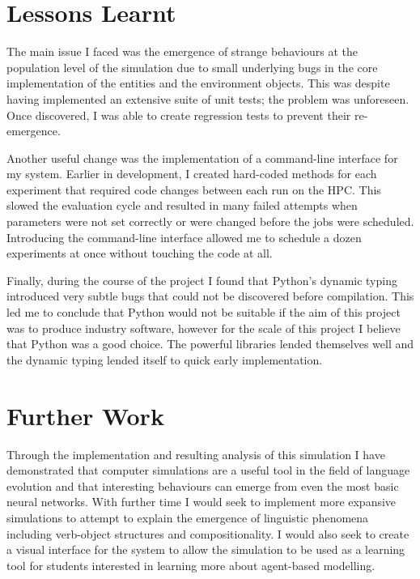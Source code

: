 \documentclass[12pt,a4paper]{report}
\begin{document}
\section{Lessons Learnt}

The main issue I faced was the emergence of strange behaviours at the population level of the simulation due to small underlying bugs in the core implementation of the entities and the environment objects. This was despite having implemented an extensive suite of unit tests; the problem was unforeseen. Once discovered, I was able to create regression tests to prevent their re-emergence.

Another useful change was the implementation of a command-line interface for my system. Earlier in development, I created hard-coded methods for each experiment that required code changes between each run on the HPC. This slowed the evaluation cycle and resulted in many failed attempts when parameters were not set correctly or were changed before the jobs were scheduled. Introducing the command-line interface allowed me to schedule a dozen experiments at once without touching the code at all.

Finally, during the course of the project I found that Python's dynamic typing introduced very subtle bugs that could not be discovered before compilation. This led me to conclude that Python would not be suitable if the aim of this project was to produce industry software, however for the scale of this project I believe that Python was a good choice. The powerful libraries lended themselves well and the dynamic typing lended itself to quick early implementation.

\section{Further Work}

Through the implementation and resulting analysis of this simulation I have demonstrated that computer simulations are a useful tool in the field of language evolution and that interesting behaviours can emerge from even the most basic neural networks. With further time I would seek to implement more expansive simulations to attempt to explain the emergence of linguistic phenomena including verb-object structures and compositionality. I would also seek to create a visual interface for the system to allow the simulation to be used as a learning tool for students interested in learning more about agent-based modelling. 



\end{document}
